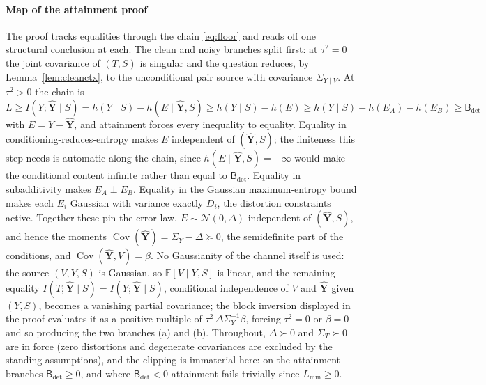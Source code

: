 ﻿\documentclass[11pt,onecolumn]{IEEEtran}
\newcommand{\E}{\mathbb{E}}
\newcommand{\Cov}{\operatorname{Cov}}
\newcommand{\Bdet}{\mathsf{B}_{\det}}
\begin{document}
\paragraph*{Map of the attainment proof}
The proof tracks equalities through the chain \eqref{eq:floor} and reads
off one structural conclusion at each. The clean and noisy branches
split first: at $\tau^2=0$ the joint covariance of $(T,S)$ is singular
and the question reduces, by Lemma~\ref{lem:cleanctx}, to the
unconditional pair source with covariance $\Sigma_{Y\mid V}$. At
$\tau^2>0$ the chain is
$L\ge I(Y;\hat{\mathbf Y}\mid S)=h(Y\mid S)-h(E\mid\hat{\mathbf Y},S)
\ge h(Y\mid S)-h(E)\ge h(Y\mid S)-h(E_A)-h(E_B)\ge\Bdet$ with
$E=Y-\hat{\mathbf Y}$, and attainment forces every inequality to
equality. Equality in conditioning-reduces-entropy makes $E$
independent of $(\hat{\mathbf Y},S)$; the finiteness this step needs is
automatic along the chain, since $h(E\mid\hat{\mathbf Y},S)=-\infty$
would make the conditional content infinite rather than equal to
$\Bdet$. Equality in subadditivity makes $E_A\perp E_B$. Equality in
the Gaussian maximum-entropy bound makes each $E_i$ Gaussian with
variance exactly $D_i$, the distortion constraints active. Together
these pin the error law, $E\sim\mathcal N(0,\Delta)$ independent of
$(\hat{\mathbf Y},S)$, and hence the moments
$\Cov(\hat{\mathbf Y})=\Sigma_Y-\Delta\succeq0$, the semidefinite part
of the conditions, and $\Cov(\hat{\mathbf Y},V)=\beta$. No Gaussianity
of the channel itself is used: the source $(V,Y,S)$ is Gaussian, so
$\E[V\mid Y,S]$ is linear, and the remaining equality
$I(T;\hat{\mathbf Y}\mid S)=I(Y;\hat{\mathbf Y}\mid S)$, conditional
independence of $V$ and $\hat{\mathbf Y}$ given $(Y,S)$, becomes a
vanishing partial covariance; the block inversion displayed in the
proof evaluates it as a positive multiple of
$\tau^2\,\Delta\Sigma_Y^{-1}\beta$, forcing $\tau^2=0$ or $\beta=0$ and
so producing the two branches (a) and (b). Throughout,
$\Delta\succ0$ and $\Sigma_T\succ0$ are in force (zero distortions and
degenerate covariances are excluded by the standing assumptions), and
the clipping is immaterial here: on the attainment branches
$\Bdet\ge0$, and where $\Bdet<0$ attainment fails trivially since
$L_{\min}\ge0$.
\end{document}
